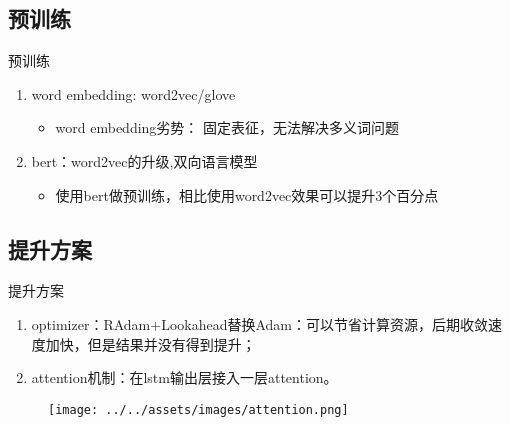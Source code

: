 \documentclass[9pt,aspectratio=169]{ctexbeamer}
\begin{document}
	\subsection{预训练}
	
	\begin{frame}{预训练}
		\begin{enumerate}
			\item word embedding: word2vec/glove
				\begin{itemize}
					\item word embedding劣势： 固定表征，无法解决多义词问题
				\end{itemize}
				
			\item bert：word2vec的升级,双向语言模型
				\begin{itemize}
					\item 使用bert做预训练，相比使用word2vec效果可以提升3个百分点
				\end{itemize}
				
		\end{enumerate}
	\end{frame}
	
	\subsection{提升方案}
	
	\begin{frame}{提升方案}
		\begin{enumerate}
			\item optimizer：RAdam+Lookahead替换Adam：可以节省计算资源，后期收敛速度加快，但是结果并没有得到提升；
			\item attention机制：在lstm输出层接入一层attention。
		\end{enumerate}
		\begin{figure}
			\centering
			\texttt{[image: ../../assets/images/attention.png]}
		\end{figure}
	
	
	
	\end{frame}
\end{document}
